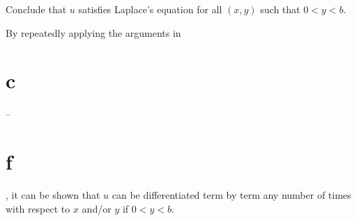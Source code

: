\begin{exerciselist}
\begin{alist}
    \item %
    Conclude that $u$ satisfies Laplace's equation for all $(x,y)$ such that $0<y<b$.
  \end{alist}

  By repeatedly applying the arguments in \part{c}--\part{f}, it can be shown that $u$ can be
  differentiated term by term any number of times with respect to $x$ and/or $y$ if $0<y<b$.
\end{exerciselist}
